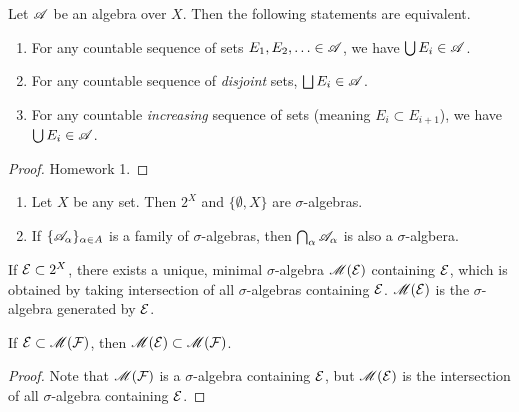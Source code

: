 \documentclass[12pt]{article} %
\begin{document}
\begin{lemma}
    Let $\mathscr{A}$ be an algebra over $X$. Then the following statements are equivalent. \begin{enumerate}
        \item For any countable sequence of sets $E_1, E_2, \ldots \in \mathscr{A}$, we have $\bigcup E_i \in \mathscr{A}$.
        \item For any countable sequence of \textit{disjoint} sets, $\bigsqcup E_i \in \mathscr{A}$.
        \item For any countable \textit{increasing} sequence of sets (meaning $E_i \subset E_{i+1}$), we have $\bigcup E_i \in \mathscr{A}$.
    \end{enumerate}
\end{lemma}

\begin{proof}
    Homework 1.
\end{proof}

\begin{example}
    \begin{enumerate}
        \item Let $X$ be any set. Then $2^X$ and $\{\emptyset, X\}$ are $\sigma$-algebras.
        \item If $\{\mathscr{A}_\alpha\}_{\alpha \in A}$ is a family of $\sigma$-algebras, then $\bigcap_{\alpha} \mathscr{A}_\alpha$ is also a $\sigma$-algbera.
    \end{enumerate}
\end{example}

\begin{proposition}
    If $\mathcal{E} \subset 2^X$, there exists a unique, minimal $\sigma$-algebra $\mathscr{M}(\mathcal{E})$ containing $\mathcal{E}$, which is obtained by taking intersection of all $\sigma$-algebras containing $\mathcal{E}$. $\mathscr{M}(\mathcal{E})$ is the $\sigma$-algebra generated by $\mathcal{E}$.
\end{proposition}


\begin{lemma}
    If $\mathcal{E} \subset \mathscr{M}(\mathcal{F})$, then $\mathscr{M}(\mathcal{E}) \subset \mathscr{M}(\mathcal{F})$.
\end{lemma}

\begin{proof}
    Note that $\mathscr{M}(\mathcal{F})$ is a $\sigma$-algebra containing $\mathcal{E}$, but $\mathscr{M}(\mathcal{E})$ is the intersection of all $\sigma$-algebra containing $\mathcal{E}$.
\end{proof}
\end{document}
